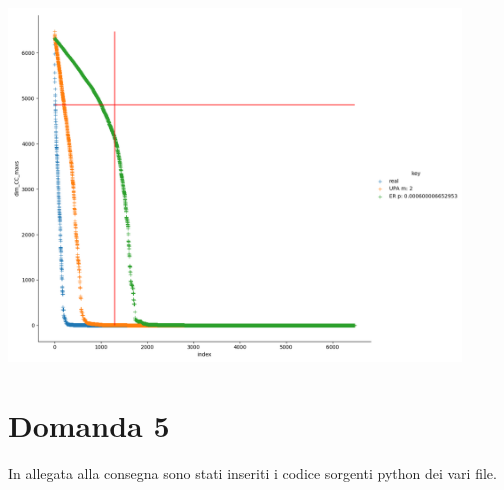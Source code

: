 \documentclass{article}
\begin{document}
\includegraphics[width=0.9\textwidth]{Figure_1}

\section{Domanda 5}
In allegata alla consegna sono stati inseriti i codice sorgenti python dei vari file.
    
\end{document}
